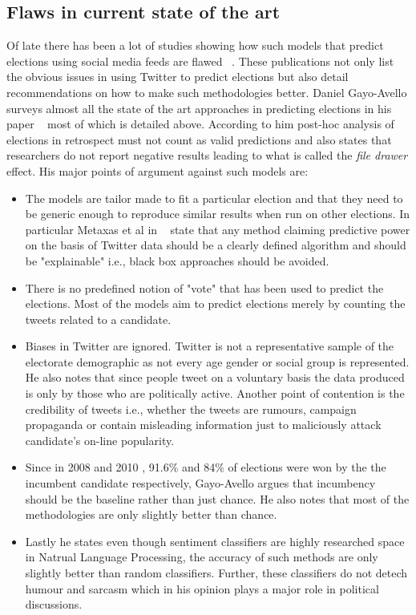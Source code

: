 \subsection{Flaws in current state of the art}
Of late there has been a lot of studies showing how such models that predict elections using social media feeds are flawed ~\cite{metaxas2011not,gayo2012wanted,gayo2011don,gayo2011limits}.
These publications not only list the obvious issues in using Twitter to predict elections but also detail recommendations on how to make such methodologies better.
Daniel Gayo-Avello surveys almost all the state of the art approaches in predicting elections in his paper ~\cite{gayo2012wanted} most of which is detailed above.
According to him post-hoc analysis of elections in retrospect must not count as valid predictions and also states that researchers do not report negative results leading to what is called the \emph{file drawer} effect. 
His major points of argument against such models are:
\begin{itemize}
\item
The models are tailor made to fit a particular election and that they need to be generic enough to reproduce similar results when run on other elections.
In particular Metaxas et al in ~\cite{metaxas2011not} state that any method claiming predictive power on the basis of Twitter data should be a clearly defined algorithm and should be "explainable" i.e., black box approaches should be avoided.
\item
There is no predefined notion of "vote" that has been used to predict the elections.
Most of the models aim to predict elections merely by counting the tweets related to a candidate.
\item
Biases in Twitter are ignored. Twitter is not a representative sample of the electorate demographic as not every age gender or social group is represented.
He also notes that since people tweet on a voluntary basis the data produced is only by those who are politically active. 
Another point of contention is the credibility of tweets i.e., whether the tweets are rumours, campaign propaganda or contain misleading information just to maliciously attack candidate's on-line popularity.
\item
Since in 2008 and 2010 , 91.6\% and 84\% of elections were won by the the incumbent candidate respectively, Gayo-Avello argues that incumbency should be the baseline rather than just chance.
He also notes that most of the methodologies are only slightly better than chance.
\item
Lastly he states even though sentiment classifiers are highly researched space in Natrual Language Processing, the accuracy of such methods are only slightly better than random classifiers. 
Further, these classifiers do not detech humour and sarcasm which in his opinion plays a major role in political discussions.
\end{itemize}
